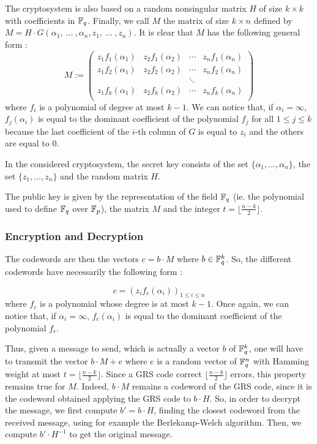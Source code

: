 \documentclass[12pt,a4paper,titlepage]{article}
\begin{document}
The cryptosystem is also based on a random nonsingular matrix $H$ of size $k\times k$ with coefficients in $\mathbb{F}_q$. Finally, we call $M$ the matrix of size $k\times n$ defined by $M=H\cdot G(\alpha_1, \ ... \ , \alpha_n, z_1, \ ... \ , z_n)$.
It is clear that $M$ has the following general form :
$$ M := \left(
\begin{array}{cccc}
z_1f_1(\alpha_1) &  z_2f_1(\alpha_2) & \cdots & z_nf_1(\alpha_n) \\
z_1f_2(\alpha_1) &  z_2f_2(\alpha_2) & \cdots & z_nf_2(\alpha_n) \\
 & & \ddots & \\
z_1f_k(\alpha_1) &  z_2f_k(\alpha_2) & \cdots & z_nf_k(\alpha_n) \\
\end{array}
\right)$$
where $f_i$ is a polynomial of degree at most $k-1$.
We can notice that, if $\alpha_i = \infty$, $f_j(\alpha_i)$ is equal to the dominant coefficient of the polynomial $f_j$ for all $1\leq j\leq k$ because the last coefficient of the $i$-th column of $G$ is equal to $z_i$ and the others are equal to $0$.

In the considered cryptosystem, the secret key consists of the set $\{\alpha_1,... ,\alpha_n\}$, the set $\{z_1,... ,z_n\}$ and the random matrix $H$.

The public key is given by the representation of the field $\mathbb{F}_q$ (ie. the polynomial used to define $\mathbb{F}_q$ over $\mathbb{F}_p$), the matrix $M$ and the integer $t=\lfloor\frac{n-k}{2}\rfloor$.

\subsubsection{Encryption and Decryption}
The codewords are then the vectors $c=b\cdot M$ where $b\in\mathbb{F}_q^k$. So, the different codewords have necessarily the following form :

$$c=(z_if_c(\alpha_i))_{1\leq i\leq n}$$ where $f_c$ is a polynomial whose degree is at most $k-1$.
Once again, we can notice that, if $\alpha_i = \infty$, $f_c(\alpha_i)$ is equal to the dominant coefficient of the polynomial $f_c$.

Thus, given a message to send, which is actually a vector $b$ of $\mathbb{F}_q^k$, one will have to transmit the vector $b\cdot M + e$ where $e$ is a random vector of $\mathbb{F}_q^n$ with Hamming weight at most $t=\lfloor\frac{n-k}{2}\rfloor$.
Since a GRS code correct $\lfloor\frac{n-k}{2}\rfloor$ errors, this property remains true for $M$. Indeed, $b\cdot M$ remains a codeword of the GRS code, since it is the codeword obtained applying the GRS code to $b\cdot H$.
So, in order to decrypt the message, we first compute $b'=b\cdot H$, finding the closest codeword from the received message, using for example the Berlekamp-Welch algorithm.
Then, we compute $b'\cdot H^{-1}$ to get the original message.
\end{document}
